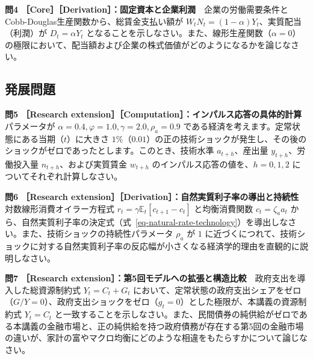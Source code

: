\documentclass[
  japanese,
  lualatex,
  ja=standard,
  12pt,
  a4paper]{ltjsarticle}
\begin{document}
\textbf{問4
［Core］［Derivation］：固定資本と企業利潤}　企業の労働需要条件とCobb-Douglas生産関数から、総賃金支払い額が
\(W_t N_t = (1-\alpha) Y_t\)、実質配当（利潤）が \(D_t = \alpha Y_t\)
となることを示しなさい。また、線形生産関数（\(\alpha = 0\)）の極限において、配当額および企業の株式価値がどのようになるかを論じなさい。

\subsection{発展問題}\label{ux767aux5c55ux554fux984c}

\textbf{問5 ［Research
extension］［Computation］：インパルス応答の具体的計算}　パラメータが
\(\alpha = 0.4, \varphi = 1.0, \gamma = 2.0, \rho_a = 0.9\)
である経済を考えます。定常状態にある当期（\(t\)）に大きさ
\(1\%\)（\(0.01\)）の正の技術ショックが発生し、その後のショックがゼロであったとします。このとき、技術水準
\(a_{t+h}\)、産出量 \(y_{t+h}\)、労働投入量 \(n_{t+h}\)、および実質賃金
\(w_{t+h}\) のインパルス応答の値を、\(h = 0, 1, 2\)
についてそれぞれ計算しなさい。

\textbf{問6 ［Research
extension］［Derivation］：自然実質利子率の導出と持続性}　対数線形消費オイラー方程式
\(r_t = \gamma \mathbb{E}_t [c_{t+1} - c_t]\) と均衡消費関数
\(c_t = \zeta_a a_t\)
から、自然実質利子率の決定式（式~\ref{eq-natural-rate-technology}）を導出しなさい。また、技術ショックの持続性パラメータ
\(\rho_a\) が \(1\)
に近づくにつれて、技術ショックに対する自然実質利子率の反応幅が小さくなる経済学的理由を直観的に説明しなさい。

\begin{samepage}

\textbf{問7 ［Research
extension］：第5回モデルへの拡張と構造比較}　政府支出を導入した総資源制約式
\(Y_t = C_t + G_t\)
において、定常状態の政府支出シェアをゼロ（\(G/Y = 0\)）、政府支出ショックをゼロ（\(g_t = 0\)）とした極限が、本講義の資源制約式
\(Y_t = C_t\)
と一致することを示しなさい。また、民間債券の純供給がゼロである本講義の金融市場と、正の純供給を持つ政府債務が存在する第5回の金融市場の違いが、家計の富やマクロ均衡にどのような相違をもたらすかについて論じなさい。

\end{samepage}
\end{document}
